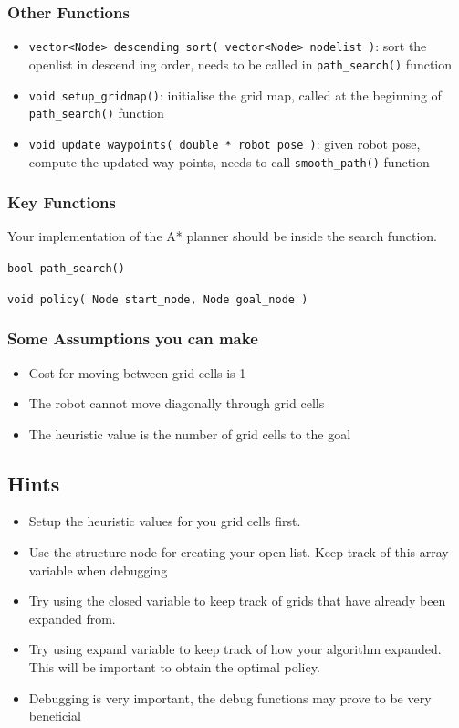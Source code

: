\documentclass[twoside,11pt]{article}
\begin{document}
\subsubsection*{Other Functions}
\begin{itemize}
	\item \texttt{vector<Node> descending sort( vector<Node> nodelist )}: sort the openlist in descend	ing order, needs to be called in \texttt{path\_search()} function
	\item \texttt{void setup\_gridmap()}: initialise the grid map, called at the beginning of \texttt{path\_search()}
	function
	\item \texttt{void update waypoints( double * robot pose )}: given robot pose, compute the updated
	way-points, needs to call \texttt{smooth\_path()} function
\end{itemize}

\subsubsection*{Key Functions}
Your implementation of the A* planner should be inside the search function.

\texttt{bool path\_search()}

\texttt{void policy( Node start\_node, Node goal\_node )}

\subsubsection*{Some Assumptions you can make}
\begin{itemize}
	\item Cost for moving between grid cells is 1
	\item The robot cannot move diagonally through grid cells
	\item The heuristic value is the number of grid cells to the goal
\end{itemize}

\subsection*{Hints}
\begin{itemize}
	\item Setup the heuristic values for you grid cells first.
\item Use the structure node for creating your open list. Keep track of this array variable when
debugging
\item Try using the closed variable to keep track of grids that have already been expanded from.
\item Try using expand variable to keep track of how your algorithm expanded. This will be
important to obtain the optimal policy.
\item Debugging is very important, the debug functions may prove to be very beneficial
\end{itemize}
\end{document}
